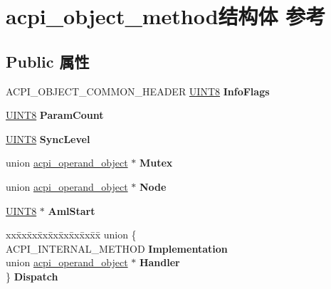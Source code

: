 \hypertarget{structacpi__object__method}{}\section{acpi\+\_\+object\+\_\+method结构体 参考}
\label{structacpi__object__method}
\subsection*{Public 属性}
\begin{DoxyCompactItemize}
\item 
\mbox{\label{structacpi__object__method_aa330a314ea3961e4fdcbd94b40a4b135}} 
A\+C\+P\+I\+\_\+\+O\+B\+J\+E\+C\+T\+\_\+\+C\+O\+M\+M\+O\+N\+\_\+\+H\+E\+A\+D\+ER \hyperlink{_processor_bind_8h_ab27e9918b538ce9d8ca692479b375b6a}{U\+I\+N\+T8} {\bfseries Info\+Flags}
\item 
\mbox{\label{structacpi__object__method_a02593046885d6371e6043ff9fd05cd3b}} 
\hyperlink{_processor_bind_8h_ab27e9918b538ce9d8ca692479b375b6a}{U\+I\+N\+T8} {\bfseries Param\+Count}
\item 
\mbox{\label{structacpi__object__method_a54b504c204c2a5de00b5239f58a930d8}} 
\hyperlink{_processor_bind_8h_ab27e9918b538ce9d8ca692479b375b6a}{U\+I\+N\+T8} {\bfseries Sync\+Level}
\item 
\mbox{\label{structacpi__object__method_ae61d49e545446c2e85fd5ae7353fede4}} 
union \hyperlink{unionacpi__operand__object}{acpi\+\_\+operand\+\_\+object} $\ast$ {\bfseries Mutex}
\item 
\mbox{\label{structacpi__object__method_afb99dea9a5eeb350a03ee5e829facb63}} 
union \hyperlink{unionacpi__operand__object}{acpi\+\_\+operand\+\_\+object} $\ast$ {\bfseries Node}
\item 
\mbox{\label{structacpi__object__method_a6a975b190b18ff73cd90f5cedfbc2502}} 
\hyperlink{_processor_bind_8h_ab27e9918b538ce9d8ca692479b375b6a}{U\+I\+N\+T8} $\ast$ {\bfseries Aml\+Start}
\item 
\mbox{\label{structacpi__object__method_a7be7367a0b72870b94a736723fe06e6f}} 
\begin{tabbing}
xx\=xx\=xx\=xx\=xx\=xx\=xx\=xx\=xx\=\kill
union \{\\
\>ACPI\_INTERNAL\_METHOD {\bfseries Implementation}\\
\>union \hyperlink{unionacpi__operand__object}{acpi\_operand\_object} $\ast$ {\bfseries Handler}\\
\} {\bfseries Dispatch}\\


\end{tabbing}
\end{DoxyCompactItemize}
